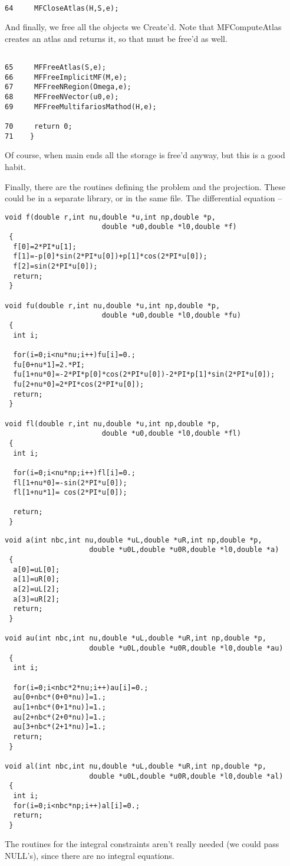 \documentclass[12pt]{article}
\begin{document}
\begin{verbatim}

64     MFCloseAtlas(H,S,e);
\end{verbatim}
And finally, we free all the objects we {Create}'d. Note that {MFComputeAtlas} creates
an atlas and returns it, so that must be free'd as well.
\begin{verbatim}

65     MFFreeAtlas(S,e);
66     MFFreeImplicitMF(M,e);
67     MFFreeNRegion(Omega,e);
68     MFFreeNVector(u0,e);
69     MFFreeMultifariosMathod(H,e);

70     return 0;
71    }
\end{verbatim}
Of course, when {main} ends all the storage is free'd anyway, but this is a good habit.

Finally, there are the routines defining the problem and the projection. These could be in a separate library, or in the same file.
The differential equation --
\begin{verbatim}
void f(double r,int nu,double *u,int np,double *p,
                       double *u0,double *l0,double *f)
 {
  f[0]=2*PI*u[1];
  f[1]=-p[0]*sin(2*PI*u[0])+p[1]*cos(2*PI*u[0]);
  f[2]=sin(2*PI*u[0]);
  return;
 }

void fu(double r,int nu,double *u,int np,double *p,
                       double *u0,double *l0,double *fu)
 {
  int i;

  for(i=0;i<nu*nu;i++)fu[i]=0.;
  fu[0+nu*1]=2.*PI;
  fu[1+nu*0]=-2*PI*p[0]*cos(2*PI*u[0])-2*PI*p[1]*sin(2*PI*u[0]);
  fu[2+nu*0]=2*PI*cos(2*PI*u[0]);
  return;
 }

void fl(double r,int nu,double *u,int np,double *p,
                       double *u0,double *l0,double *fl)
 {
  int i;

  for(i=0;i<nu*np;i++)fl[i]=0.;
  fl[1+nu*0]=-sin(2*PI*u[0]);
  fl[1+nu*1]= cos(2*PI*u[0]);

  return;
 }
\end{verbatim}

\begin{verbatim}
void a(int nbc,int nu,double *uL,double *uR,int np,double *p,
                    double *u0L,double *u0R,double *l0,double *a)
 {
  a[0]=uL[0];
  a[1]=uR[0];
  a[2]=uL[2];
  a[3]=uR[2];
  return;
 }

void au(int nbc,int nu,double *uL,double *uR,int np,double *p,
                    double *u0L,double *u0R,double *l0,double *au)
 {
  int i;

  for(i=0;i<nbc*2*nu;i++)au[i]=0.;
  au[0+nbc*(0+0*nu)]=1.;
  au[1+nbc*(0+1*nu)]=1.;
  au[2+nbc*(2+0*nu)]=1.;
  au[3+nbc*(2+1*nu)]=1.;
  return;
 }

void al(int nbc,int nu,double *uL,double *uR,int np,double *p,
                    double *u0L,double *u0R,double *l0,double *al)
 {
  int i;
  for(i=0;i<nbc*np;i++)al[i]=0.;
  return;
 }
\end{verbatim}
The routines for the integral constraints aren't really needed (we could pass NULL's), since there are no integral equations.
\end{document}
